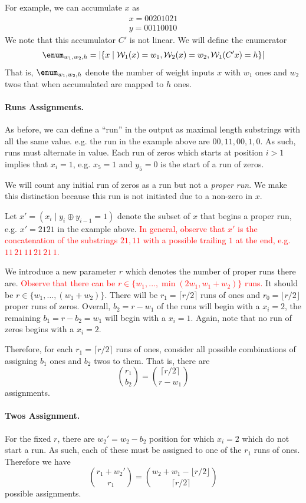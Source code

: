 For example, we can accumulate $x$ as 
\begin{align*}
    x= 00201021\\
    y= 00110010
\end{align*} 
We note that this accumulator $C'$ is not linear. 
We will define the enumerator 
$$
\enum_{w_1,w_2,h} = |\{ x \mid \mathcal{W}_1(x)=w_1, \mathcal{W}_2(x)=w_2, \mathcal{W}_1(C'x)=h \}|
$$
That is, $\enum_{w_1,w_2,h}$ denote the number of weight inputs $x$ with $w_1$ ones and $w_2$ twos that when accumulated are mapped to $h$ ones.

\paragraph{Runs Assignments.} As before, we can define a ``run'' in the output as maximal length substrings with all the same value. e.g. the run in the example above are $00,11,00,1,0$. As such, runs must alternate in value. Each run of zeros which starts at position $i>1$ implies that $x_i=1$, e.g. $x_5=1$ and $y_5=0$ is the start of a run of zeros.

We will count any initial run of zeros as a run but not a \emph{proper run}. We make this distinction because this run is not initiated due to a non-zero in $x$.

Let $x'=(x_i \mid y_i \oplus y_{i-1} = 1)$ denote the subset of $x$ that begins a proper run, e.g. $x'=2121$ in the example above. \textcolor{red}{In general, observe that $x'$ is the concatenation of the substrings $21,11$ with a possible trailing $1$ at the end, e.g. $11\, 21\, 11\, 21\, 21\, 1$.}


We introduce a new parameter $r$ which denotes the number of proper runs there are. \textcolor{red}{Observe that there can be $r\in \{w_1,...,\min(2w_1, w_1+w_2)\}$ runs.} It should be $r \in \{w_1, \ldots, (w_1 + w_2)\}$. There will be $r_1=\lceil r/2\rceil$ runs of ones and $r_0=\lfloor r/2\rfloor$ proper runs of zeros. Overall, $b_2=r-w_1$ of the runs will begin with a $x_i=2$, the remaining $b_1 = r - b_2 = w_1$ will begin with a $x_i=1$. Again, note that no run of zeros begins with a $x_i=2$.

Therefore, for each $r_1=\lceil r/2\rceil$ runs of ones, consider all possible combinations of assigning $b_1$ ones and $b_2$ twos to them. That is, there are
$$
{r_1 \choose b_2} = {\lceil r/2\rceil \choose r-w_1}
$$
assignments. 


\paragraph{Twos Assignment.} For the fixed $r$, there are $w_2'=w_2-b_2$ position for which $x_i=2$ which do not start a run. As such, each of these must be assigned to one of the $r_1$ runs of ones. Therefore we have
$$
{r_1 + w_2' \choose r_1} = {w_2+w_1-\lfloor r/2\rfloor \choose \lceil r/2\rceil}
$$
possible assignments. 

